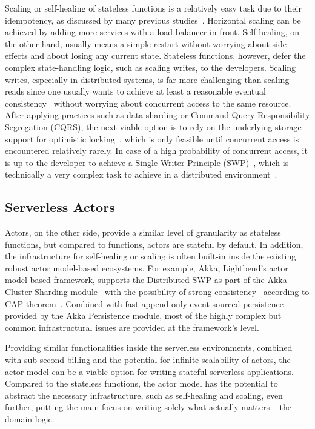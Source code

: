 \documentclass[conference]{IEEEtran}
\begin{document}
Scaling or self-healing of stateless functions is a relatively easy task due to their idempotency, as discussed by many previous studies~\cite{helland_toobig_2017,castro_rise_2019}. Horizontal scaling can be achieved by adding more services with a load balancer in front. Self-healing, on the other hand, usually means a simple restart without worrying about side effects and about losing any current state. Stateless functions, however, defer the complex state-handling logic, such as scaling writes, to the developers. Scaling writes, especially in distributed systems, is far more challenging than scaling reads since one usually wants to achieve at least a reasonable eventual consistency~\cite{vogels_eventually_2009} without worrying about concurrent access to the same resource. After applying practices such as data sharding or Command Query Responsibility Segregation (CQRS), the next viable option is to rely on the underlying storage support for optimistic locking~\cite{halici_optimistic_1991}, which is only feasible until concurrent access is encountered relatively rarely. In case of a high probability of concurrent access, it is up to the developer to achieve a Single Writer Principle (SWP)~\cite{thompson_mechanical_2011}, which is technically a very complex task to achieve in a distributed environment~\cite{ludwikowski_when_2021}.

\subsection{Serverless Actors}
Actors, on the other side, provide a similar level of granularity as stateless functions, but compared to functions, actors are stateful by default. In addition, the infrastructure for self-healing or scaling is often built-in inside the existing robust actor model-based ecosystems. For example, Akka, Lightbend's actor model-based framework, supports the Distributed SWP as part of the Akka Cluster Sharding module~\cite{ludwikowski_when_2021,enes_single-writer_2017} with the possibility of strong consistency~\cite{lightbend_distributed_2022} according to CAP theorem~\cite{gilbert02cap}. Combined with fast append-only event-sourced persistence provided by the Akka Persistence module, most of the highly complex but common infrastructural issues are provided at the framework's level.

Providing similar functionalities inside the serverless environments, combined with sub-second billing and the potential for infinite scalability of actors, the actor model can be a viable option for writing stateful serverless applications. Compared to the stateless functions, the actor model has the potential to abstract the necessary infrastructure, such as self-healing and scaling, even further, putting the main focus on writing solely what actually matters -- the domain logic.
\end{document}
